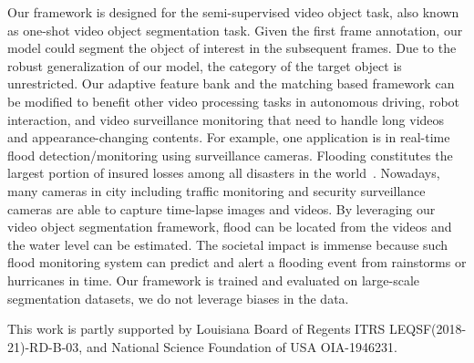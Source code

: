 \documentclass{article}
\begin{document}
Our framework is designed for the semi-supervised video object task, also known as one-shot video object segmentation task. 
Given the first frame annotation, our model could segment the object of interest in the subsequent frames.
Due to the robust generalization of our model, the category of the target object is unrestricted.
Our adaptive feature bank and the matching based framework can be modified to benefit other video processing tasks in autonomous driving, robot interaction, and video surveillance monitoring that need to handle long videos and appearance-changing contents.
For example, one application is in real-time flood detection/monitoring using surveillance cameras. 
Flooding constitutes the largest portion of insured losses among all disasters in the world~\cite{aerts2014evaluating}.
Nowadays, many cameras in city including traffic monitoring and security surveillance cameras are able to capture time-lapse images and videos.
By leveraging our video object segmentation framework, flood can be located from the videos and the water level can be estimated.
The societal impact is immense because such flood monitoring system can predict and alert a flooding event from rainstorms or hurricanes in time.
Our framework is trained and evaluated on large-scale segmentation datasets, we do not leverage biases in the data.

\begin{ack}
This work is partly supported by Louisiana Board of Regents ITRS LEQSF(2018-21)-RD-B-03, and National Science Foundation of USA OIA-1946231.
\end{ack}



\end{document}
